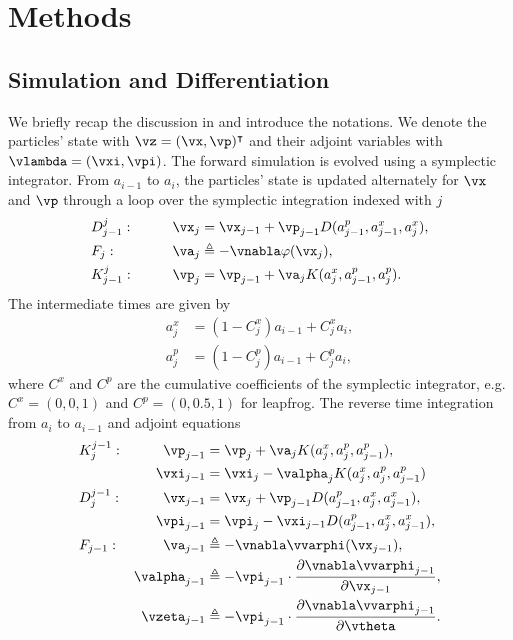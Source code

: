 \documentclass[usenatbib]{mnras}
\newcommand{\p}{\partial}
\begin{document}
\section{Methods}


\subsection{Simulation and Differentiation}

We briefly recap the discussion in \citet{Li2022a} and introduce the notations.
We denote the particles' state with $\vz = (\vx, \vp)^\intercal$ and their
adjoint variables with $\vlambda = (\vxi, \vpi)$.
The forward simulation is evolved using a symplectic integrator.
From $a_{i-1}$ to $a_i$, the particles' state is updated alternately for $\vx$
and $\vp$ through a loop over the symplectic integration indexed with $j$
\begin{alignat}{2}
&D_{j-1}^j: &\qquad \vx_j &= \vx_{j-1} +
  \vp_{j-1} D(a^p_{j-1}, a^x_{j-1}, a^x_j), \nonumber\\
%
&F_j: & \va_j &\triangleq -\vnabla\varphi(\vx_j), \nonumber\\
%
&K_{j-1}^j: & \vp_j &= \vp_{j-1} + \va_j K(a^x_j, a^p_{j-1}, a^p_j).
\label{DFK}
\end{alignat}
The intermediate times are given by
\begin{align}
a^x_j &= (1 - C^x_j) a_{i-1} + C^x_j a_i, \nonumber\\
a^p_j &= (1 - C^p_j) a_{i-1} + C^p_j a_i,
\end{align}
where $C^x$ and $C^p$ are the cumulative coefficients of the symplectic
integrator, e.g. $C^x = (0, 0, 1)$ and $C^p = (0, 0.5, 1)$ for leapfrog.
The reverse time integration from $a_i$ to $a_{i-1}$ and adjoint equations
\begin{alignat}{2}
&K_j^{j-1}: &\qquad \vp_{j-1} &= \vp_j +
  \va_j K(a^x_j, a^p_j, a^p_{j-1}), \nonumber\\
%
& & \vxi_{j-1} &= \vxi_j - \valpha_j K(a^x_j, a^p_j, a^p_{j-1}) \nonumber\\
%
&D_j^{j-1}: & \vx_{j-1} &= \vx_j +
  \vp_{j-1} D(a^p_{j-1}, a^x_j, a^x_{j-1}), \nonumber\\
%
& & \vpi_{j-1} &= \vpi_j - \vxi_{j-1} D(a^p_{j-1}, a^x_j, a^x_{j-1}), \nonumber\\
%
&F_{j-1}: & \va_{j-1} &\triangleq -\vnabla\vvarphi(\vx_{j-1}), \nonumber\\
%
& & \valpha_{j-1} &\triangleq -\vpi_{j-1} \cdot
  \frac{\p\vnabla\vvarphi_{j-1}}{\p\vx_{j-1}}, \nonumber\\
& & \vzeta_{j-1} &\triangleq - \vpi_{j-1} \cdot
  \frac{\p\vnabla\vvarphi_{j-1}}{\p\vtheta}.
\label{KDF_adj}
\end{alignat}
\end{document}
